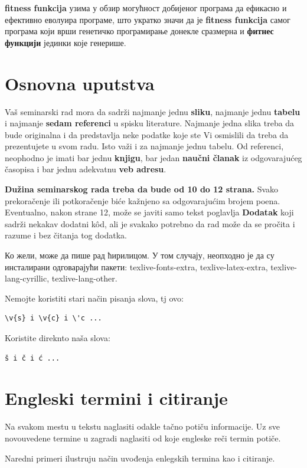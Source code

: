 \documentclass[a4paper]{article}
\begin{document}
\textbf{fitness funkcija} узима у обзир могућност добијеног програма да ефикасно и ефективно еволуира програме, што укратко значи да је \textbf{fitness funkcija} самог програма који врши генетичко програмирање донекле сразмерна и \textbf{фитнес функцији} јединки које генерише.

\section{Osnovna uputstva}
Vaš seminarski rad mora da sadrži najmanje jednu \textbf{sliku}, najmanje jednu \textbf{tabelu} i najmanje \textbf{sedam referenci} u spisku literature. Najmanje jedna slika treba da bude originalna i da predstavlja neke podatke koje ste Vi osmislili da treba da prezentujete u svom radu. Isto važi i za najmanje jednu tabelu. 	Od referenci, neophodno je imati bar jednu \textbf{knjigu}, bar jedan \textbf{naučni članak} iz odgovarajućeg časopisa i bar jednu adekvatnu \textbf{veb adresu}. 

\textbf{Dužina seminarskog rada treba da bude od 10 do 12 strana.} Svako prekoračenje ili potkoračenje biće kažnjeno sa odgovarajućim brojem poena. Eventualno, nakon strane 12, može se javiti samo tekst poglavlja \textbf{Dodatak} koji sadrži nekakav dodatni k\^{o}d, ali je svakako potrebno da rad može da se pročita i razume i bez čitanja tog dodatka. 

Ко жели, може да пише рад ћирилицом. У том случају, неопходно је да су инсталирани одговарајући пакети: texlive-fonts-extra, texlive-latex-extra, texlive-lang-cyrillic, texlive-lang-other. 

Nemojte koristiti stari način pisanja slova, tj ovo:
\begin{verbatim}
\v{s} i \v{c} i \'c ...
\end{verbatim}
Koristite direknto naša slova:	
\begin{verbatim}
š i č i ć ... 
\end{verbatim}


\section{Engleski termini i citiranje}	
\label{sec:termini_i_citiranje}

Na svakom mestu u tekstu naglasiti odakle tačno potiču informacije. Uz sve novouvedene termine u zagradi naglasiti od koje engleske reči termin potiče. 

Naredni primeri ilustruju način uvođenja enlegskih termina kao i citiranje.
\end{document}
